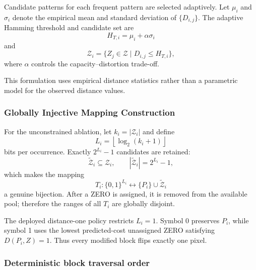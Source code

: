 Candidate patterns for each frequent pattern are selected adaptively.
Let $\mu_i$ and $\sigma_i$ denote the empirical mean and standard deviation of $\{D_{i,j}\}$.
The adaptive Hamming threshold and candidate set are
\begin{equation}
H_{T,i}=\mu_i+\alpha\sigma_i
\label{eq:adaptive-threshold}
\end{equation}
and
\begin{equation}
\mathcal{Z}_i = \{ Z_j \in \mathcal{Z} \mid D_{i,j} \le H_{T,i} \},
\label{eq:adaptive-candidate-set}
\end{equation}
where $\alpha$ controls the capacity--distortion trade-off.

\RevisionAddBegin
This formulation uses empirical distance statistics rather than a parametric
model for the observed distance values.
\RevisionAddEnd

\subsubsection{Globally Injective Mapping Construction}

For the unconstrained ablation, let $k_i=|\mathcal{Z}_i|$ and define
\begin{equation}
L_i = \left\lfloor \log_2 (k_i + 1) \right\rfloor
\label{eq:bits-per-occurrence}
\end{equation}
bits per occurrence. Exactly $2^{L_i}-1$ candidates are retained:
\begin{equation}
\widetilde{\mathcal Z}_i\subseteq\mathcal Z_i,\qquad
|\widetilde{\mathcal Z}_i|=2^{L_i}-1,
\label{eq:retained-zero-set}
\end{equation}
which makes the mapping
\begin{equation}
T_i:\{0,1\}^{L_i}\longleftrightarrow
\{P_i\}\cup\widetilde{\mathcal Z}_i
\label{eq:local-bijection}
\end{equation}
a genuine bijection. After a ZERO is assigned, it is removed from the
available pool; therefore the ranges of all $T_i$ are globally disjoint.

The deployed distance-one policy restricts $L_i=1$. Symbol 0 preserves
$P_i$, while symbol 1 uses the lowest predicted-cost unassigned ZERO satisfying
$D(P_i,Z)=1$. Thus every modified block flips exactly one pixel.

\subsubsection*{Deterministic block traversal order}
\label{subsec:order}

